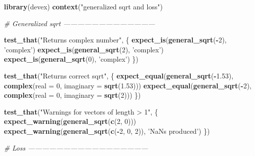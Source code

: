 \documentclass[]{book}
\newenvironment{Shaded}{\begin{snugshade}}{\end{snugshade}}
\newcommand{\KeywordTok}[1]{\textcolor[rgb]{0.13,0.29,0.53}{\textbf{#1}}}
\newcommand{\DataTypeTok}[1]{\textcolor[rgb]{0.13,0.29,0.53}{#1}}
\newcommand{\DecValTok}[1]{\textcolor[rgb]{0.00,0.00,0.81}{#1}}
\newcommand{\FloatTok}[1]{\textcolor[rgb]{0.00,0.00,0.81}{#1}}
\newcommand{\StringTok}[1]{\textcolor[rgb]{0.31,0.60,0.02}{#1}}
\newcommand{\CommentTok}[1]{\textcolor[rgb]{0.56,0.35,0.01}{\textit{#1}}}
\newcommand{\OperatorTok}[1]{\textcolor[rgb]{0.81,0.36,0.00}{\textbf{#1}}}
\newcommand{\NormalTok}[1]{#1}
\begin{document}
\begin{Shaded}
\begin{Highlighting}[]
\KeywordTok{library}\NormalTok{(devex)}
\KeywordTok{context}\NormalTok{(}\StringTok{"generalized sqrt and loss"}\NormalTok{)}

\CommentTok{# Generalized sqrt ---------------------------------------}

\KeywordTok{test_that}\NormalTok{(}\StringTok{"Returns complex number"}\NormalTok{, \{}
  \KeywordTok{expect_is}\NormalTok{(}\KeywordTok{general_sqrt}\NormalTok{(}\OperatorTok{-}\DecValTok{2}\NormalTok{), }\StringTok{'complex'}\NormalTok{)}
  \KeywordTok{expect_is}\NormalTok{(}\KeywordTok{general_sqrt}\NormalTok{(}\DecValTok{2}\NormalTok{), }\StringTok{'complex'}\NormalTok{)}
  \KeywordTok{expect_is}\NormalTok{(}\KeywordTok{general_sqrt}\NormalTok{(}\DecValTok{0}\NormalTok{), }\StringTok{'complex'}\NormalTok{)}
\NormalTok{\})}

\KeywordTok{test_that}\NormalTok{(}\StringTok{"Returns correct sqrt"}\NormalTok{, \{}
  \KeywordTok{expect_equal}\NormalTok{(}\KeywordTok{general_sqrt}\NormalTok{(}\OperatorTok{-}\FloatTok{1.53}\NormalTok{), }\KeywordTok{complex}\NormalTok{(}\DataTypeTok{real =} \DecValTok{0}\NormalTok{, }\DataTypeTok{imaginary =} \KeywordTok{sqrt}\NormalTok{(}\FloatTok{1.53}\NormalTok{)))}
  \KeywordTok{expect_equal}\NormalTok{(}\KeywordTok{general_sqrt}\NormalTok{(}\OperatorTok{-}\DecValTok{2}\NormalTok{), }\KeywordTok{complex}\NormalTok{(}\DataTypeTok{real =} \DecValTok{0}\NormalTok{, }\DataTypeTok{imaginary =} \KeywordTok{sqrt}\NormalTok{(}\DecValTok{2}\NormalTok{)))}
\NormalTok{\})}

\KeywordTok{test_that}\NormalTok{(}\StringTok{"Warnings for vectors of length > 1"}\NormalTok{, \{}
  \KeywordTok{expect_warning}\NormalTok{(}\KeywordTok{general_sqrt}\NormalTok{(}\KeywordTok{c}\NormalTok{(}\DecValTok{2}\NormalTok{, }\DecValTok{0}\NormalTok{)))}
  \KeywordTok{expect_warning}\NormalTok{(}\KeywordTok{general_sqrt}\NormalTok{(}\KeywordTok{c}\NormalTok{(}\OperatorTok{-}\DecValTok{2}\NormalTok{, }\DecValTok{0}\NormalTok{, }\DecValTok{2}\NormalTok{)), }\StringTok{'NaNs produced'}\NormalTok{)}
\NormalTok{\})}

\CommentTok{# Loss ---------------------------------------------------}


\end{Highlighting}
\end{Shaded}
\end{document}
